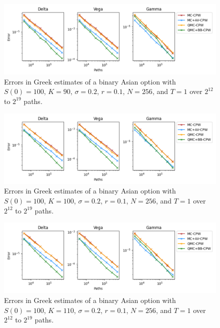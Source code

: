 \begin{figure}[H]
    \centering
    \includegraphics[width=1\textwidth]{figures/binary path errors k=90.pdf}
    \caption{Errors in Greek estimates of a binary Asian option with $S(0)=100$, $K=90$, $\sigma = 0.2$, $r=0.1$, $N=256$, and $T=1$ over $2^{12}$ to $2^{19}$ paths.}
    \label{fig:BinaryPathErrorsK90}
\end{figure}

\begin{figure}[H]
    \centering
    \includegraphics[width=1\textwidth]{figures/binary path errors k=100.pdf}
    \caption{Errors in Greek estimates of a binary Asian option with $S(0)=100$, $K=100$, $\sigma = 0.2$, $r=0.1$, $N=256$, and $T=1$ over $2^{12}$ to $2^{19}$ paths.}
    \label{fig:BinaryPathErrorsK100}
\end{figure}

\begin{figure}[H]
    \centering
    \includegraphics[width=1\textwidth]{figures/binary path errors k=110.pdf}
    \caption{Errors in Greek estimates of a binary Asian option with $S(0)=100$, $K=110$, $\sigma = 0.2$, $r=0.1$, $N=256$, and $T=1$ over $2^{12}$ to $2^{19}$ paths.}
    \label{fig:BinaryPathErrorsK110}
\end{figure}


